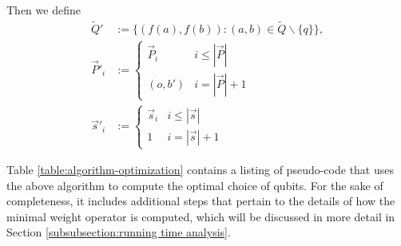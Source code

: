 \documentclass[twocolumn,showpacs,preprintnumbers,amsmath,amssymb,nofootinbib,pra,floatfix]{revtex4-1}
\newenvironment{definition}[1][Definition]{\begin{trivlist}
\item[\hskip \labelsep {\bfseries #1}]}{\end{trivlist}}
\newcommand{\lst}{\vec}
\newcommand{\set}{\tilde}
\begin{document}
\begin{definition}
Then we define
$$
\begin{aligned}
\set Q'&:= \{(f(a),f(b)):(a,b)\in\set Q\backslash\{q\}\},\\
\lst P'_i&:=
\begin{cases}
\lst P_i & i \le |\lst P| \\
(o,b') & i = |\lst P|+1
\end{cases} \\
\lst s'_i&:=
\begin{cases}
\lst s_i & i \le |\lst s|\\
1 & i = |\lst s|+1
\end{cases}
\end{aligned}
$$
\end{definition}

Table \ref{table:algorithm-optimization} contains a listing of pseudo-code that uses the above algorithm to compute the optimal choice of qubits.  For the sake of completeness, it includes additional steps that pertain to the details of how the minimal weight operator is computed, which will be discussed in more detail in Section \ref{subsubsection:running time analysis}.
\end{document}
